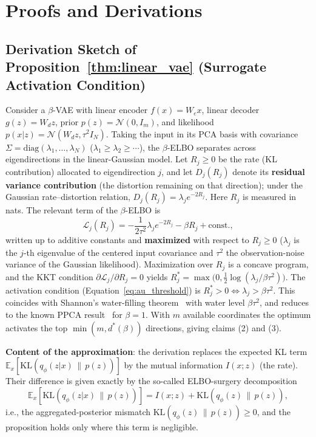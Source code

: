 \documentclass[make,article,submit,pdftex,moreauthors]{Definitions/mdpi}
\newcommand{\dstar}{d^{*}(\beta)}
\begin{document}
\appendixstart
\appendix

\section[\appendixname~\thesection]{Proofs and Derivations}\label{app:proofs}

\subsection[\appendixname~\thesubsection]{Derivation Sketch of Proposition~\ref{thm:linear_vae} (Surrogate Activation Condition)}

Consider a $\beta$-VAE with linear encoder $f(x) = W_e x$, linear decoder
$g(z) = W_d z$, prior $p(z) = \mathcal{N}(0, I_m)$, and likelihood
$p(x|z) = \mathcal{N}(W_d z, \tau^2 I_N)$.
Taking the input in its PCA basis with covariance
$\Sigma = \mathrm{diag}(\lambda_1, \ldots, \lambda_N)$
($\lambda_1 \geq \lambda_2 \geq \cdots$), the $\beta$-ELBO separates across
eigendirections in the linear-Gaussian model.
Let $R_j \geq 0$ be the rate (KL contribution) allocated to eigendirection
$j$, and let $D_j(R_j)$ denote its \textbf{residual variance contribution}
(the distortion remaining on that direction); under the Gaussian
rate--distortion relation, $D_j(R_j) = \lambda_j e^{-2R_j}$.
Here $R_j$ is measured in nats.
The relevant term of the $\beta$-ELBO is
\begin{equation}
  \mathcal{L}_j(R_j) = -\frac{1}{2\tau^2}\lambda_j e^{-2R_j} - \beta R_j + \text{const.},
\end{equation}
written up to additive constants and \textbf{maximized} with respect to
$R_j \geq 0$ ($\lambda_j$ is the $j$-th eigenvalue of the centered input
covariance and $\tau^2$ the observation-noise variance of the Gaussian
likelihood).
Maximization over $R_j$ is a concave program, and the KKT condition
$\partial \mathcal{L}_j / \partial R_j = 0$ yields
$R_j^* = \max\bigl(0, \tfrac{1}{2}\log(\lambda_j / \beta\tau^2)\bigr)$.
The activation condition (Equation~\eqref{eq:au_threshold}) is
$R_j^* > 0 \iff \lambda_j > \beta\tau^2$.
This coincides with Shannon's water-filling theorem~\cite{cover2006elements}
with water level $\beta\tau^2$, and reduces to the known PPCA
result~\cite{tippingbishop1999ppca} for $\beta = 1$.
With $m$ available coordinates the optimum activates the top
$\min(m, \dstar)$ directions, giving claims (2) and (3).

\textbf{Content of the approximation}: the derivation replaces the expected
KL term $\mathbb{E}_x[\mathrm{KL}(q_\phi(z|x)\,\|\,p(z))]$ by the mutual
information $I(x; z)$ (the rate).
Their difference is given exactly by the so-called ELBO-surgery
decomposition~\cite{hoffman2016elbo}
\begin{equation}
  \mathbb{E}_x[\mathrm{KL}(q_\phi(z|x)\,\|\,p(z))]
  = I(x; z) + \mathrm{KL}(q_\phi(z)\,\|\,p(z)),
  \label{eq:elbo_surgery}
\end{equation}
i.e., the aggregated-posterior mismatch
$\mathrm{KL}(q_\phi(z)\,\|\,p(z)) \geq 0$, and the proposition holds only
where this term is negligible.
\end{document}
